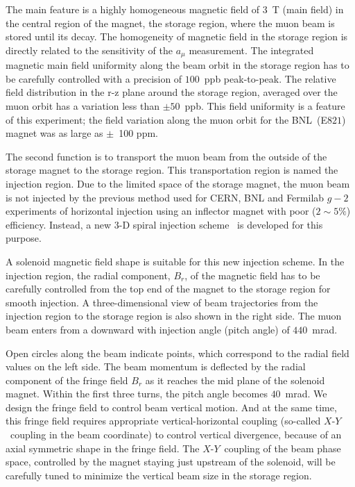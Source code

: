 The main feature is a highly homogeneous magnetic field of $3$~T (main field) 
in the central region of the magnet, the storage region, where the muon beam is stored until its decay. 
The homogeneity of magnetic field in the storage region is directly related to the sensitivity of the $a_{\mu}$ measurement.
The integrated magnetic main field uniformity along the beam orbit in the storage region has to
be carefully controlled with a precision of $100$~ppb peak-to-peak.
The relative field distribution in the r-z plane around the storage region, averaged over the muon orbit has a variation less than $\pm 50$~ppb. 
This field uniformity is a feature of this experiment; the field variation along the muon orbit for the BNL~(E$821$) magnet was as large as $\pm$~100 ppm.

The second function is to transport the muon beam from the outside of the storage magnet to the storage region. 
This transportation region is named the injection region.
Due to the limited space of the storage magnet, the muon beam is not injected by the previous method used for CERN, BNL and Fermilab $g-2$ experiments of horizontal injection using an inflector magnet with poor ($2\sim5\%$) efficiency. 
Instead, a new $3$-D spiral injection scheme~\cite{Iinuma:2016zfu} is developed for this purpose.

A solenoid magnetic field shape is suitable for this new injection scheme. 
In the injection region, the radial component, $B_{r}$, of the magnetic field has to be carefully controlled from the top end of the magnet to the storage region for smooth injection. 
A three-dimensional view of beam trajectories from the injection region to the storage region is also shown in the right side. 
The muon beam enters from a downward with injection angle (pitch angle) of $440$~mrad. 

Open circles along the beam indicate points, which correspond to the radial field values on the left side.  
The beam momentum is deflected by the radial component of the fringe field $B_{r}$ 
as it reaches the mid plane of the solenoid magnet. Within the first three turns, the pitch angle becomes $40$~mrad.  
We design the fringe field to control beam vertical motion.
And at the same time, this fringe field requires  
appropriate vertical-horizontal coupling (so-called $X$-$Y$~coupling in the beam coordinate) to control vertical divergence, 
because of an axial symmetric shape in the fringe field. 
The $X$-$Y$~coupling of the beam phase space, controlled by the magnet staying just upstream of the solenoid, will be carefully tuned to 
minimize the vertical beam size in the storage region. 

